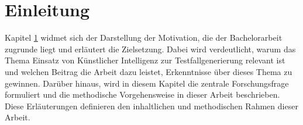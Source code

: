 \documentclass[12pt,toc=bib,toc=listof]{scrreprt}
\begin{document}
\newpage
{}

\chapter{Einleitung} %
\label{sec:einleitung}
Kapitel \ref{sec:einleitung} widmet sich der Darstellung der Motivation, die der Bachelorarbeit zugrunde liegt und erläutert die Zielsetzung. Dabei wird verdeutlicht, warum das Thema \glqq Einsatz von Künstlicher Intelligenz zur Testfallgenerierung\grqq{} relevant ist und welchen Beitrag die Arbeit dazu leistet, Erkenntnisse über dieses Thema zu gewinnen. Darüber hinaus, wird in diesem Kapitel die zentrale Forschungsfrage formuliert und die methodische Vorgehensweise in dieser Arbeit beschrieben. Diese Erläuterungen definieren den inhaltlichen und methodischen Rahmen dieser Arbeit.
\end{document}
